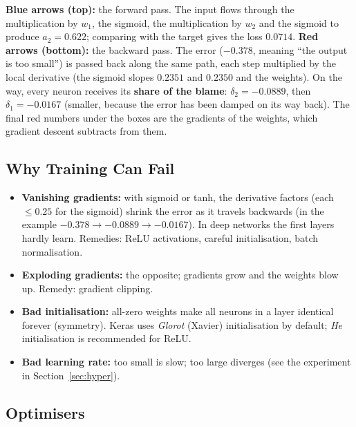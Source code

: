 \begin{explain}
\textbf{Blue arrows (top):} the forward pass. The input flows through the multiplication by $w_1$, the sigmoid, the multiplication by $w_2$ and the sigmoid to produce $a_2=0.622$; comparing with the target gives the loss $0.0714$. \textbf{Red arrows (bottom):} the backward pass. The error ($-0.378$, meaning ``the output is too small'') is passed back along the same path, each step multiplied by the local derivative (the sigmoid slopes $0.2351$ and $0.2350$ and the weights). On the way, every neuron receives its \textbf{share of the blame}: $\delta_2=-0.0889$, then $\delta_1=-0.0167$ (smaller, because the error has been damped on its way back). The final red numbers under the boxes are the gradients of the weights, which gradient descent subtracts from them.
\end{explain}

\subsection{Why Training Can Fail}

\begin{itemize}
  \item \textbf{Vanishing gradients:} with sigmoid or tanh, the derivative factors (each $\le0.25$ for the sigmoid) shrink the error as it travels backwards (in the example $-0.378\to-0.0889\to-0.0167$). In deep networks the first layers hardly learn. Remedies: ReLU activations, careful initialisation, batch normalisation.
  \item \textbf{Exploding gradients:} the opposite; gradients grow and the weights blow up. Remedy: gradient clipping.
  \item \textbf{Bad initialisation:} all-zero weights make all neurons in a layer identical forever (symmetry). Keras uses \emph{Glorot} (Xavier) initialisation by default; \emph{He} initialisation is recommended for ReLU.
  \item \textbf{Bad learning rate:} too small is slow; too large diverges (see the experiment in Section~\ref{sec:hyper}).
\end{itemize}

\subsection{Optimisers}

